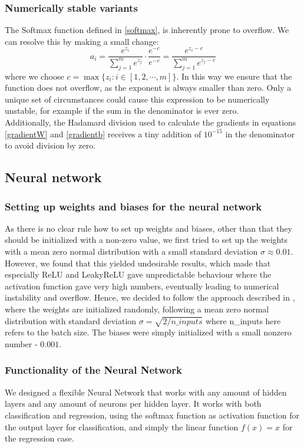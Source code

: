 \documentclass[11pt,a4paper,titlepage]{article}
\begin{document}
\subsubsection{Numerically stable variants}
The Softmax function defined in \eqref{softmax}, is inherently prone to overflow. We can resolve this by making a small change:
\begin{equation}
a_i= \frac{e^{z_i}}{\sum_{j=1}^{m} e^{z_j}} \cdot \frac{e^{-c}}{e^{-c}} = \frac{e^{z_i-c}}{\sum_{j=1}^{m} e^{z_j-c}}
\end{equation}
where we choose $c = \max \{ z_i : i \in [1,2,\cdots ,m]\} $. In this way we ensure that the function does not overflow, as the exponent is always smaller than zero. Only a unique set of circumstances could cause this expression to be numerically unstable, for example if the sum in the denominator is ever zero.\\Additionally, the Hadamard division used to calculate the gradients in equations \eqref{gradientW} and \eqref{gradientb} receives a tiny addition of $10^{-15}$ in the denominator to avoid division by zero.

\subsection{Neural network}
\subsubsection{Setting up weights and biases for the neural network}
As there is no clear rule how to set up weights and biases, other than that they should be initialized with a non-zero value, we first tried to set up the weights with a mean zero normal distribution with a small standard deviation $\sigma\approx0.01$. However, we found that this yielded undesirable results, which made that especially ReLU and LeakyReLU gave unpredictable behaviour where the activation function gave very high numbers, eventually leading to numerical instability and overflow. Hence, we decided to follow the approach described in \cite{DelvingDeep}, where the weights are initialized randomly, following a mean zero normal distribution with standard deviation $\sigma=\sqrt{2/n\_inputs}$ where n\_inputs here refers to the batch size. The biases were simply initialized with a small nonzero number - $0.001$.
\subsubsection{Functionality of the Neural Network}
We designed a flexible Neural Network that works with any amount of hidden layers and any amount of neurons per hidden layer. It works with both classification and regression, using the softmax function as activation function for the output layer for classification, and simply the linear function $f(x)=x$ for the regression case. 
\end{document}
